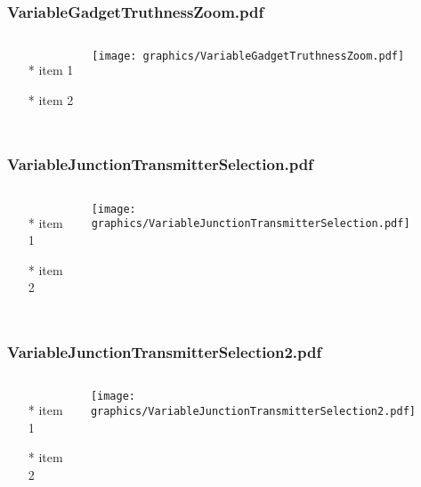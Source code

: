 \documentclass{beamer}
\begin{document}
\begin{frame} \frametitle{VariableGadgetTruthnessZoom.pdf}
    \begin{columns}[c]
        \begin{itemize}
            \item[*] item 1
            \item[*] item 2
        \end{itemize}
        \begin{minipage}{\linewidth}
            \begin{center}
            \texttt{[image: graphics/VariableGadgetTruthnessZoom.pdf]}
            \label{gfx:VariableGadgetTruthnessZoom.pdf}
            \end{center}
        \end{minipage}
    \end{columns}
\end{frame}
\begin{frame} \frametitle{VariableJunctionTransmitterSelection.pdf}
    \begin{columns}[c]
        \begin{itemize}
            \item[*] item 1
            \item[*] item 2
        \end{itemize}
        \begin{minipage}{\linewidth}
            \begin{center}
            \texttt{[image: graphics/VariableJunctionTransmitterSelection.pdf]}
            \label{gfx:VariableJunctionTransmitterSelection.pdf}
            \end{center}
        \end{minipage}
    \end{columns}
\end{frame}
\begin{frame} \frametitle{VariableJunctionTransmitterSelection2.pdf}
    \begin{columns}[c]
        \begin{itemize}
            \item[*] item 1
            \item[*] item 2
        \end{itemize}
        \begin{minipage}{\linewidth}
            \begin{center}
            \texttt{[image: graphics/VariableJunctionTransmitterSelection2.pdf]}
            \label{gfx:VariableJunctionTransmitterSelection2.pdf}
            \end{center}
        \end{minipage}
    \end{columns}
\end{frame}
\end{document}

